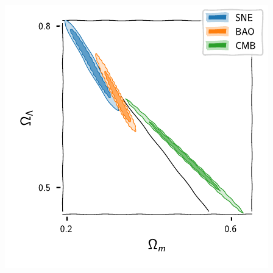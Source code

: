 \documentclass[aspectratio=169]{beamer}
\begin{document}
\begin{frame}
\begin{columns}
        \includegraphics[width=\textwidth]{figures/universe_constraints_zoom}
    \end{columns}

    
\end{frame}
\end{document}
